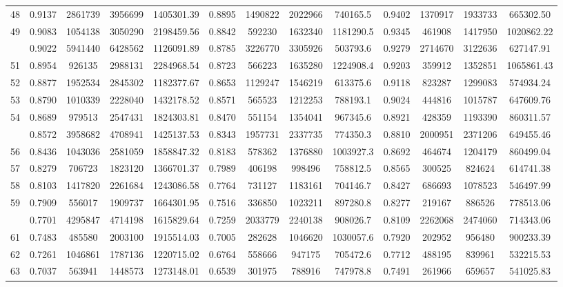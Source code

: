 \documentclass[
  12pt,
]{article}
\begin{document}
\begin{longtable}[t]{lcccccccccccc}
48 & 0.9137 & 2861739 & 3956699 & 1405301.39 & 0.8895 & 1490822 & 2022966 & 740165.5 & 0.9402 & 1370917 & 1933733 & 665302.50\\
49 & 0.9083 & 1054138 & 3050290 & 2198459.56 & 0.8842 & 592230 & 1632340 & 1181290.5 & 0.9345 & 461908 & 1417950 & 1020862.22\\
\addlinespace
50 & 0.9022 & 5941440 & 6428562 & 1126091.89 & 0.8785 & 3226770 & 3305926 & 503793.6 & 0.9279 & 2714670 & 3122636 & 627147.91\\
51 & 0.8954 & 926135 & 2988131 & 2284968.54 & 0.8723 & 566223 & 1635280 & 1224908.4 & 0.9203 & 359912 & 1352851 & 1065861.43\\
52 & 0.8877 & 1952534 & 2845302 & 1182377.67 & 0.8653 & 1129247 & 1546219 & 613375.6 & 0.9118 & 823287 & 1299083 & 574934.24\\
53 & 0.8790 & 1010339 & 2228040 & 1432178.52 & 0.8571 & 565523 & 1212253 & 788193.1 & 0.9024 & 444816 & 1015787 & 647609.76\\
54 & 0.8689 & 979513 & 2547431 & 1824303.81 & 0.8470 & 551154 & 1354041 & 967345.6 & 0.8921 & 428359 & 1193390 & 860311.57\\
\addlinespace
55 & 0.8572 & 3958682 & 4708941 & 1425137.53 & 0.8343 & 1957731 & 2337735 & 774350.3 & 0.8810 & 2000951 & 2371206 & 649455.46\\
56 & 0.8436 & 1043036 & 2581059 & 1858847.32 & 0.8183 & 578362 & 1376880 & 1003927.3 & 0.8692 & 464674 & 1204179 & 860499.04\\
57 & 0.8279 & 706723 & 1823120 & 1366701.37 & 0.7989 & 406198 & 998496 & 758812.5 & 0.8565 & 300525 & 824624 & 614741.38\\
58 & 0.8103 & 1417820 & 2261684 & 1243086.58 & 0.7764 & 731127 & 1183161 & 704146.7 & 0.8427 & 686693 & 1078523 & 546497.99\\
59 & 0.7909 & 556017 & 1909737 & 1664301.95 & 0.7516 & 336850 & 1023211 & 897280.8 & 0.8277 & 219167 & 886526 & 778513.06\\
\addlinespace
60 & 0.7701 & 4295847 & 4714198 & 1615829.64 & 0.7259 & 2033779 & 2240138 & 908026.7 & 0.8109 & 2262068 & 2474060 & 714343.06\\
61 & 0.7483 & 485580 & 2003100 & 1915514.03 & 0.7005 & 282628 & 1046620 & 1030057.6 & 0.7920 & 202952 & 956480 & 900233.39\\
62 & 0.7261 & 1046861 & 1787136 & 1220715.02 & 0.6764 & 558666 & 947175 & 705472.6 & 0.7712 & 488195 & 839961 & 532215.53\\
63 & 0.7037 & 563941 & 1448573 & 1273148.01 & 0.6539 & 301975 & 788916 & 747978.8 & 0.7491 & 261966 & 659657 & 541025.83\\

\end{longtable}
\end{document}
